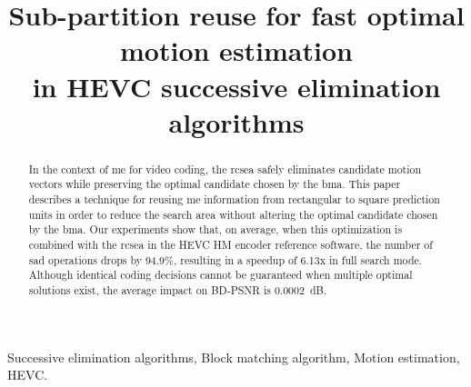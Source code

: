 \documentclass{article}
\title{Sub-partition reuse for fast optimal motion estimation \\ in  HEVC successive elimination algorithms}
\begin{document}

\maketitle

\begin{abstract}
In the context of \gls{me} for video coding, the \gls{rcsea} safely eliminates candidate motion vectors while preserving the optimal candidate chosen by the \gls{bma}. This paper describes a technique for reusing \gls{me} information from rectangular to square prediction units in order to reduce the search area without altering the optimal candidate chosen by the \gls{bma}. Our experiments show that, on average, when this optimization is combined with the \gls{rcsea} in the HEVC HM encoder reference software, the number of \gls{sad} operations drops by $94.9\%$, resulting in a speedup of 6.13x in full search mode. Although identical coding decisions cannot be guaranteed when multiple optimal solutions exist, the average impact on BD-PSNR is 0.0002~dB.
\end{abstract}

\begin{keywords}
\small{Successive elimination algorithms, Block matching algorithm, Motion estimation, HEVC.}
\end{keywords}

\glsresetall

\vspace{-0.5em}
\end{document}
